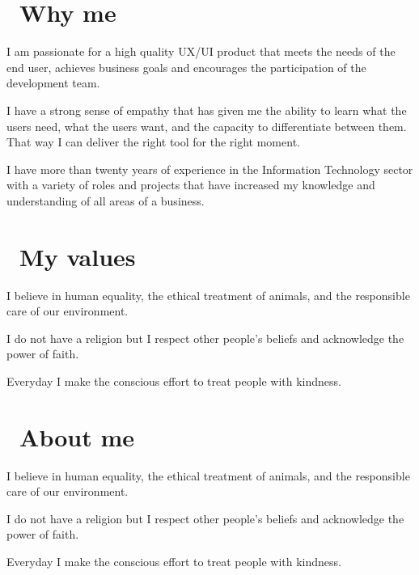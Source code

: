 \documentclass{resume}
\begin{document}



\section{\faUser\ Why me}
  \role{}{}
  I am passionate for a high quality UX/UI product that meets the needs of the end user, achieves business goals and encourages the participation of the development team.\par

  I have a strong sense of empathy that has given me the ability to learn what the users need, what the users want, and the capacity to differentiate between them. That way I can deliver the right tool for the right moment.\par
  
  I have more than twenty years of experience in the Information Technology sector with a variety of roles and projects that have increased my knowledge and understanding of all areas of a business.\par

\section{\faUser\ My values}
  \role{}{}
  I believe in human equality, the ethical treatment of animals, and the responsible care of our environment.\par

  I do not have a religion but I respect other people's beliefs and acknowledge the power of faith.\par

  Everyday I make the conscious effort to treat people with kindness.\par

\section{\faUser\ About me}
  \role{}{}
  I believe in human equality, the ethical treatment of animals, and the responsible care of our environment.\par

  I do not have a religion but I respect other people's beliefs and acknowledge the power of faith.\par

  Everyday I make the conscious effort to treat people with kindness.\par

%
%
\end{document}
